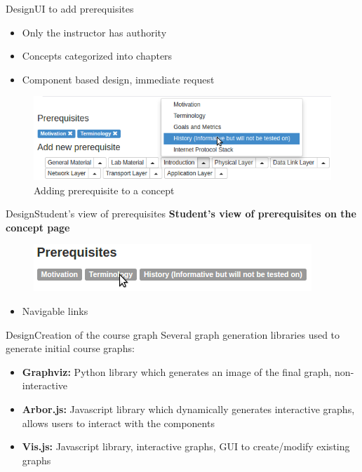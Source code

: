 \documentclass[xcolor=table]{beamer}
\begin{document}
\begin{frame}{Design}{UI to add prerequisites}
	\begin{itemize}
		\item Only the instructor has authority
		\item Concepts categorized into chapters
		\item Component based design, immediate request
	\end{itemize}
	\begin{figure}
		\centering
		\includegraphics[width=0.6\linewidth]{media/add_prereq}
		\caption{Adding prerequisite to a concept}
		\label{fig:add_prereq}
	\end{figure}
\end{frame}

\begin{frame}{Design}{Student's view of prerequisites}
	\textbf{Student's view of prerequisites on the concept page}
	\begin{figure}
		\centering
		\includegraphics[width=0.5\linewidth]{./media/prereq_stud}
		\label{fig:prereq_stud}
	\end{figure}
	\begin{itemize}
		\item Navigable links
	\end{itemize}
\end{frame}

\begin{frame}{Design}{Creation of the course graph}
Several graph generation libraries used to generate initial course graphs:
	\begin{itemize}
		\item \textbf{Graphviz:} Python library which generates an image of the final graph, non-interactive
		\item \textbf{Arbor.js:} Javascript library which dynamically generates interactive graphs, allows users to interact with the components
		\item \textbf{Vis.js:} Javascript library, interactive graphs, GUI to create/modify existing graphs
	\end{itemize}
\end{frame}
\end{document}
